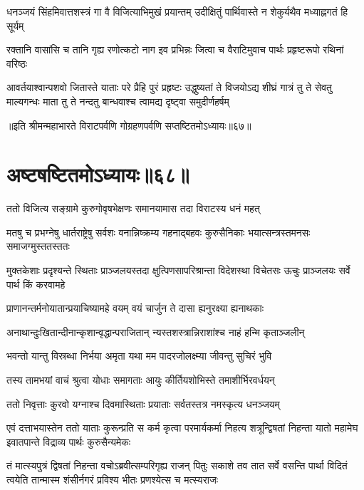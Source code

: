 \twolineshloka
{धनञ्जयं सिंहमिवात्तशस्त्रं गा वै विजित्याभिमुखं प्रयान्तम्}
{उदीक्षितुं पार्थिवास्ते न शेकुर्यथैव मध्याह्नगतं हि सूर्यम्}


\twolineshloka
{रक्तानि वासांसि च तानि गृह्य रणोत्कटो नाग इव प्रभिन्नः}
{जित्वा च वैराटिमुवाच पार्थः प्रहृष्टरूपो रथिनां वरिष्ठः}


\threelineshloka
{आवर्तयाश्वान्पशवो जितास्ते याताः परे प्रैहि पुरं प्रहृष्टः}
{उद्धुष्यतां ते विजयोऽद्य शीघ्रं गात्रं तु ते सेवतु माल्यगन्धः}
{माता तु ते नन्दतु बान्धवाश्च त्वामद्य दृष्ट्वा समुदीर्णहर्षम्}

॥इति श्रीमन्महाभारते विराटपर्वणि गोग्रहणपर्वणि सप्तष्टितमोऽध्यायः॥६७॥

\chapter{अष्टषष्टितमोऽध्यायः॥६८॥}

\twolineshloka
{ततो विजित्य सङ्ग्रामे कुरुगोवृषभेक्षणः}
{समानयामास तदा विराटस्य धनं महत्}


\threelineshloka
{मतषु च प्रभग्नेषु धार्तराष्ट्रेषु सर्वशः}
{वनान्निष्क्रम्य गहनाद्बहवः कुरुसैनिकाः}
{भयात्सन्त्रस्तमनसः समाजग्मुस्ततस्ततः}


\threelineshloka
{मुक्तकेशाः प्रदृश्यन्ते स्थिताः प्राञ्जलयस्तदा}
{क्षुत्पिणसापरिश्रान्ता विदेशस्था विचेतसः}
{ऊचुः प्राञ्जलयः सर्वे पार्थ किं करवामहे}


\twolineshloka
{प्राणानन्तर्मनोयातान्प्रयाचिष्यामहे वयम्}
{वयं चार्जुन ते दासा ह्यनुरक्ष्या ह्यनाथकाः}




\twolineshloka
{अनाथान्दुःखितान्दीनान्कृशान्वृद्धान्पराजितान्}
{न्यस्तशस्त्रान्निराशांश्च नाहं हन्मि कृताञ्जलीन्}


\twolineshloka
{भवन्तो यान्तु विस्रब्धा निर्भया अमृता यथा}
{मम पादरजोलक्ष्म्या जीवन्तु सुचिरं भुवि}


\twolineshloka
{तस्य तामभयां वाचं श्रुत्वा योधाः समागताः}
{आयुः कीर्तियशोभिस्ते तमाशीर्भिरवर्धयन्}


\twolineshloka
{ततो निवृत्ताः कुरवो यग्नाश्च दिवमास्थिताः}
{प्रयाताः सर्वतस्तत्र नमस्कृत्य धनञ्जयम्}


\onelineshloka
{एवं दत्ताभयास्तेन ततो याताः कुरून्प्रति}
\twolineshloka
{स कर्म कृत्वा परमार्यकर्मा निहत्य शत्रून्द्विषतां निहन्ता}
{यातो महामेघ इवातपान्ते विद्राव्य पार्थः कुरुसैन्यमेकः}


\onelineshloka
{तं मात्स्यपुत्रं द्विषतां निहन्ता वचोऽब्रवीत्सम्परिगृह्य राजन्}
\twolineshloka
{पितुः सकाशे तव तात सर्वे वसन्ति पार्था विदितं त्वयेति}
{तान्मास्म शंसीर्नगरं प्रविश्य भीतः प्रणश्येत्स च मत्स्यराजः}


